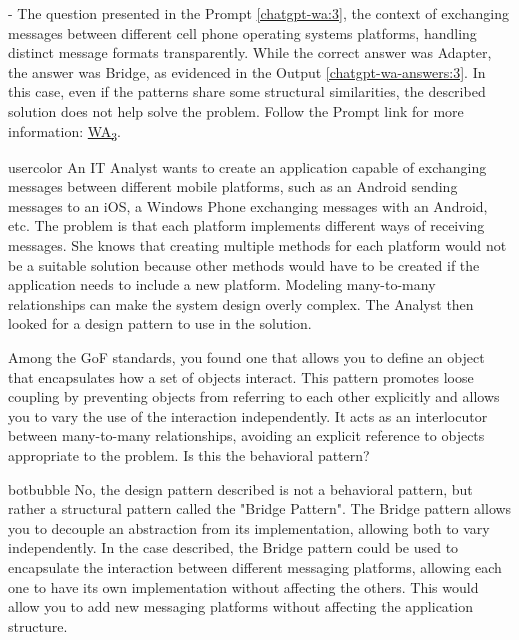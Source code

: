  - The question presented in the Prompt \ref{chatgpt-wa:3}, the context of exchanging messages between different cell phone operating systems platforms, handling distinct message formats transparently. While the correct answer was Adapter, the answer was Bridge, as evidenced in the Output \ref{chatgpt-wa-answers:3}. In this case, even if the patterns share some structural similarities, the described solution does not help solve the problem. Follow the Prompt link for more information: \href{https://chat.openai.com/share/97f7ae9f-9403-41e9-9627-8973af95edb8}{WA\textsubscript{3}}.
\begin{chatquest}{usercolor}{\chatgptquest[chatgpt-wa:3]}
An IT Analyst wants to create an application capable of exchanging messages between different mobile platforms, such as an Android sending messages to an iOS, a Windows Phone exchanging messages with an Android, etc. The problem is that each platform implements different ways of receiving messages. She knows that creating multiple methods for each platform would not be a suitable solution because other methods would have to be created if the application needs to include a new platform. Modeling many-to-many relationships can make the system design overly complex. The Analyst then looked for a design pattern to use in the solution. 

Among the GoF standards, you found one that allows you to define an object that encapsulates how a set of objects interact. This pattern promotes loose coupling by preventing objects from referring to each other explicitly and allows you to vary the use of the interaction independently. It acts as an interlocutor between many-to-many relationships, avoiding an explicit reference to objects appropriate to the problem. Is this the behavioral pattern?
\end{chatquest}
\begin{chatout}{botbubble}{}
No, the design pattern described is not a behavioral pattern, but rather a structural pattern called the "Bridge Pattern". The Bridge pattern allows you to decouple an abstraction from its implementation, allowing both to vary independently. In the case described, the Bridge pattern could be used to encapsulate the interaction between different messaging platforms, allowing each one to have its own implementation without affecting the others. This would allow you to add new messaging platforms without affecting the application structure.
\end{chatout}    

